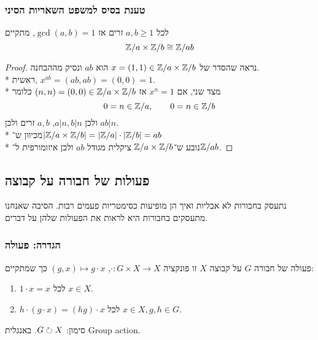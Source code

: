 \subsubsection{טענת בסיס למשפט השאריות הסיני}
לכל $a, b \ge 1$ זרים אז $\gcd(a, b) = 1$, מתקיים
\[
	\mathbb{Z}/a \times \mathbb{Z}/b \cong \mathbb{Z}/ab
\]
\begin{proof}
	נראה שהסדר של $x = (1, 1) \in \mathbb{Z}/a \times \mathbb{Z}/b$ הוא $ab$ ונסיק מההבחנה. \\*
	ראשית, $x^{ab} = (ab, ab) = (0, 0) = 1$. \\*
	מצד שני, אם $x^n = 1$ אז $(n, n) = (0, 0) \in \mathbb{Z}/a \times \mathbb{Z}/b$ כלומר
	\[
		0 = n \in \mathbb{Z}/a, \qquad 0 = n \in \mathbb{Z}/b
	\]
	ולכן $a | n, b | n$, $a, b$ זרים ולכן $ab | n$. \\*
	מכיוון ש־$|\mathbb{Z}/a \times \mathbb{Z}/b| = |\mathbb{Z}/a| \cdot |\mathbb{Z}/b| = ab$ \\*
	נובע ש־$\mathbb{Z}/a \times \mathbb{Z}/b$ ציקלית מגודל $ab$ ולכן איזומורפית ל־$\mathbb{Z}/ab$.
\end{proof}

\subsection{פעולות של חבורה על קבוצה}
נתעסק בחבורות לא אבליות ואיך הן מופיעות כסימטריות פעמים רבות.
הסיבה שאנחנו מתעסקים בחבורות היא לראות את הפעולות שלהן על דברים.

\subsubsection{הגדרה: פעולה}
פעולה של חבורה $G$ על קבוצה $X$ זו פונקציה $\cdot : G \times X \to X$, $(g, x) \mapsto g \cdot x$ כך שמתקיים:
\begin{enumerate}
	\item $1 \cdot x = x$ לכל $x \in X$.
	\item $h \cdot (g \cdot x) = (hg) \cdot x$ לכל $x \in X, g, h \in G$.
\end{enumerate}
סימון: $G \circlearrowright X$. באנגלית Group action.

